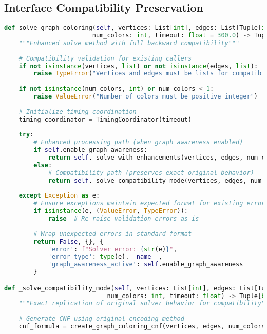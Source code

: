 \subsection{Interface Compatibility Preservation}
\label{appendix:interface-compatibility}

\begin{lstlisting}[language=Python, caption=Interface Compatibility Preservation]
def solve_graph_coloring(self, vertices: List[int], edges: List[Tuple[int, int]], 
                        num_colors: int, timeout: float = 300.0) -> Tuple[bool, Dict[int, int], Dict]:
    """Enhanced solve method with full backward compatibility"""
    
    # Compatibility validation for existing callers
    if not isinstance(vertices, list) or not isinstance(edges, list):
        raise TypeError("Vertices and edges must be lists for compatibility")
    
    if not isinstance(num_colors, int) or num_colors < 1:
        raise ValueError("Number of colors must be positive integer")
    
    # Initialize timing coordination
    timing_coordinator = TimingCoordinator(timeout)
    
    try:
        # Enhanced processing path (when graph awareness enabled)
        if self.enable_graph_awareness:
            return self._solve_with_enhancements(vertices, edges, num_colors, timing_coordinator)
        else:
            # Compatibility path (preserves exact original behavior)
            return self._solve_compatibility_mode(vertices, edges, num_colors, timeout)
            
    except Exception as e:
        # Ensure exceptions maintain expected format for existing error handlers
        if isinstance(e, (ValueError, TypeError)):
            raise  # Re-raise validation errors as-is
        
        # Wrap unexpected errors in standard format
        return False, {}, {
            'error': f"Solver error: {str(e)}",
            'error_type': type(e).__name__,
            'graph_awareness_active': self.enable_graph_awareness
        }

def _solve_compatibility_mode(self, vertices: List[int], edges: List[Tuple[int, int]], 
                            num_colors: int, timeout: float) -> Tuple[bool, Dict[int, int], Dict]:
    """Exact replication of original solver behavior for compatibility"""
    
    # Generate CNF using original encoding method
    cnf_formula = create_graph_coloring_cnf(vertices, edges, num_colors)
    

\end{lstlisting}
